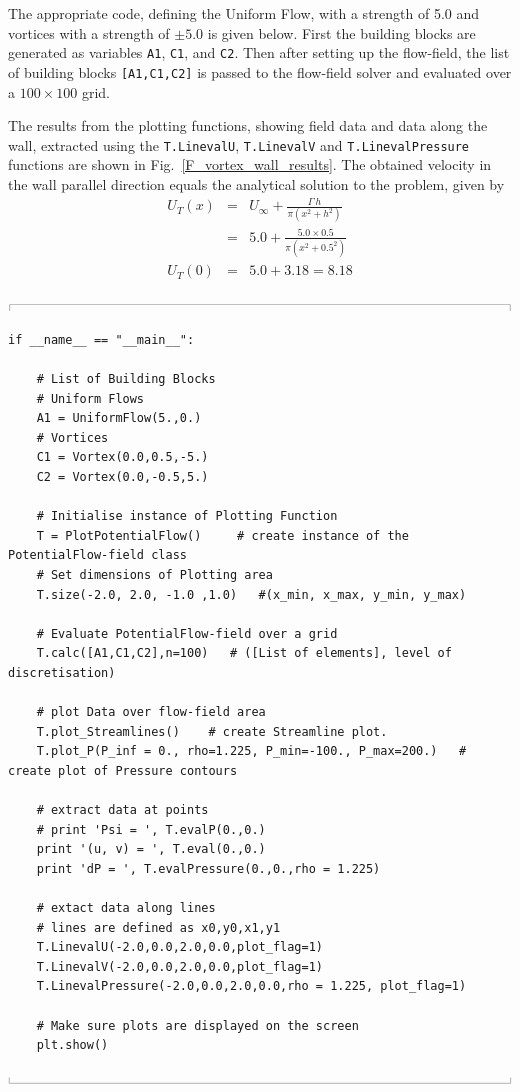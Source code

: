 \documentclass[10pt,a4paper]{article}
\newcommand{\topbar}{\ensuremath{
    \rule{0.1mm}{2.0mm} \rule[2.0mm]{159.5mm}{0.1mm} \rule{0.1mm}{2.0mm}
}}
\newcommand{\bottombar}{\ensuremath{
    \rule{0.1mm}{2.0mm} \rule{159.5mm}{0.1mm} \rule{0.1mm}{2.0mm}
}}
\begin{document}
The appropriate code, defining the Uniform Flow, with a strength of \num{5.0} and vortices with a strength of $\pm \num{5.0}$ is given below. 
First the building blocks are generated as variables \verb'A1', \verb'C1', and \verb'C2'. 
Then after setting up the flow-field, the list of building blocks \verb'[A1,C1,C2]' is passed to the flow-field solver and evaluated over a $100 \times 100$ grid. 

The results from the plotting functions, showing field data and data along the wall, extracted using the \verb'T.LinevalU', \verb'T.LinevalV' and \verb'T.LinevalPressure ' functions are shown in Fig.~\ref{F_vortex_wall_results}.   
The obtained velocity in the wall parallel direction equals the analytical solution to the problem, given by
\begin{eqnarray}
U_T(x) &=& U_{\infty} +  \frac{ \Gamma \, h}{\pi \left( x^2 + h^2\right) }  \\
\nonumber	& =& \num{5.0}  +  \frac{ \num{5.0} \times \num{0.5} }{\pi \left( x^2 + \num{0.5}^2\right) } \\
\nonumber U_T(0) &=&  \num{5.0} + \num{3.18} = \num{8.18}
\end{eqnarray}


\noindent
\topbar
\begin{lstlisting}
if __name__ == "__main__":

    # List of Building Blocks 
    # Uniform Flows  
    A1 = UniformFlow(5.,0.)
    # Vortices
    C1 = Vortex(0.0,0.5,-5.)
    C2 = Vortex(0.0,-0.5,5.)

    # Initialise instance of Plotting Function
    T = PlotPotentialFlow()   	# create instance of the PotentialFlow-field class
    # Set dimensions of Plotting area
    T.size(-2.0, 2.0, -1.0 ,1.0)   #(x_min, x_max, y_min, y_max)

    # Evaluate PotentialFlow-field over a grid
    T.calc([A1,C1,C2],n=100)   # ([List of elements], level of discretisation)

    # plot Data over flow-field area
    T.plot_Streamlines()    # create Streamline plot.
    T.plot_P(P_inf = 0., rho=1.225, P_min=-100., P_max=200.)   # create plot of Pressure contours

    # extract data at points
    # print 'Psi = ', T.evalP(0.,0.)
    print '(u, v) = ', T.eval(0.,0.)
    print 'dP = ', T.evalPressure(0.,0.,rho = 1.225)

    # extact data along lines 
    # lines are defined as x0,y0,x1,y1
    T.LinevalU(-2.0,0.0,2.0,0.0,plot_flag=1)
    T.LinevalV(-2.0,0.0,2.0,0.0,plot_flag=1)
    T.LinevalPressure(-2.0,0.0,2.0,0.0,rho = 1.225, plot_flag=1)

    # Make sure plots are displayed on the screen
    plt.show()
\end{lstlisting}
\bottombar
\end{document}
